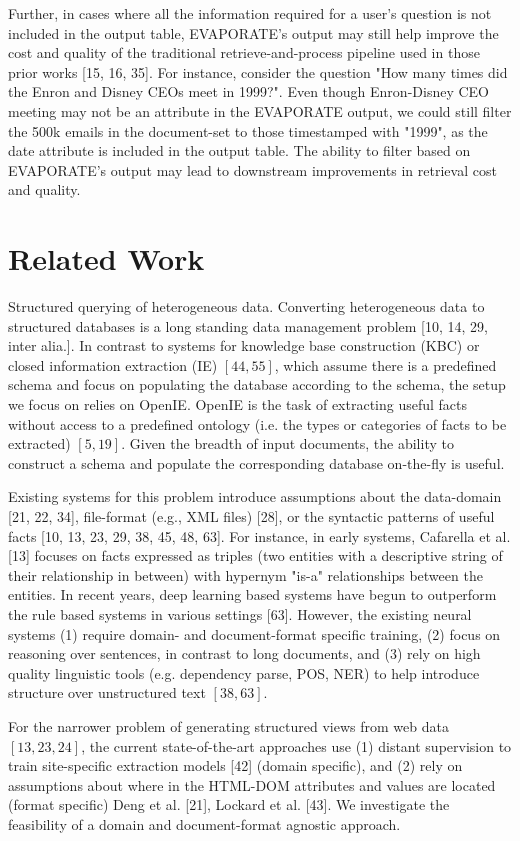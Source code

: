 \documentclass[10pt]{article}
\begin{document}
Further, in cases where all the information required for a user's question is not included in the output table, EVAPORATE's output may still help improve the cost and quality of the traditional retrieve-and-process pipeline used in those prior works [15, 16, 35]. For instance, consider the question "How many times did the Enron and Disney CEOs meet in 1999?". Even though Enron-Disney CEO meeting may not be an attribute in the EVAPORATE output, we could still filter the 500k emails in the document-set to those timestamped with "1999", as the date attribute is included in the output table. The ability to filter based on EVAPORATE's output may lead to downstream improvements in retrieval cost and quality.

\section{Related Work}
Structured querying of heterogeneous data. Converting heterogeneous data to structured databases is a long standing data management problem [10, 14, 29, inter alia.]. In contrast to systems for knowledge base construction (KBC) or closed information extraction (IE) $[44,55]$, which assume there is a predefined schema and focus on populating the database according to the schema, the setup we focus on relies on OpenIE. OpenIE is the task of extracting useful facts without access to a predefined ontology (i.e. the types or categories of facts to be extracted) $[5,19]$. Given the breadth of input documents, the ability to construct a schema and populate the corresponding database on-the-fly is useful.

Existing systems for this problem introduce assumptions about the data-domain [21, 22, 34], file-format (e.g., XML files) [28], or the syntactic patterns of useful facts [10, 13, 23, 29, 38, 45, 48, 63]. For instance, in early systems, Cafarella et al. [13] focuses on facts expressed as triples (two entities with a descriptive string of their relationship in between) with hypernym "is-a" relationships between the entities. In recent years, deep learning based systems have begun to outperform the rule based systems in various settings [63]. However, the existing neural systems (1) require domain- and document-format specific training, (2) focus on reasoning over sentences, in contrast to long documents, and (3) rely on high quality linguistic tools (e.g. dependency parse, POS, NER) to help introduce structure over unstructured text $[38,63]$.

For the narrower problem of generating structured views from web data $[13,23,24]$, the current state-of-the-art approaches use (1) distant supervision to train site-specific extraction models [42] (domain specific), and (2) rely on assumptions about where in the HTML-DOM attributes and values are located (format specific) Deng et al. [21], Lockard et al. [43]. We investigate the feasibility of a domain and document-format agnostic approach.
\end{document}
